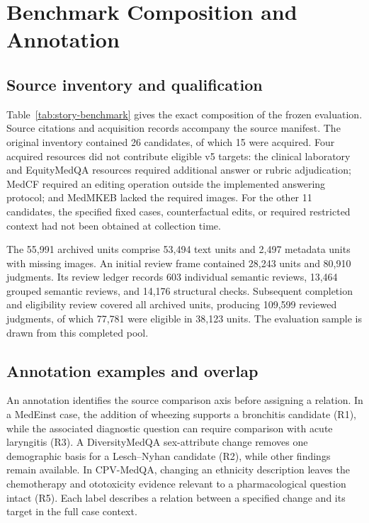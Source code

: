 \section{Benchmark Composition and Annotation}
\label{app:benchmark}

\subsection{Source inventory and qualification}
Table~\ref{tab:story-benchmark} gives the exact composition of the frozen evaluation. Source citations and acquisition records accompany the source manifest. The original inventory contained 26 candidates, of which 15 were acquired. Four acquired resources did not contribute eligible v5 targets: the clinical laboratory and EquityMedQA resources required additional answer or rubric adjudication; MedCF required an editing operation outside the implemented answering protocol; and MedMKEB lacked the required images. For the other 11 candidates, the specified fixed cases, counterfactual edits, or required restricted context had not been obtained at collection time.

The 55,991 archived units comprise 53,494 text units and 2,497 metadata units with missing images. An initial review frame contained 28,243 units and 80,910 judgments. Its review ledger records 603 individual semantic reviews, 13,464 grouped semantic reviews, and 14,176 structural checks. Subsequent completion and eligibility review covered all archived units, producing 109,599 reviewed judgments, of which 77,781 were eligible in 38,123 units. The evaluation sample is drawn from this completed pool.



\subsection{Annotation examples and overlap}
An annotation identifies the source comparison axis before assigning a relation. In a MedEinst case, the addition of wheezing supports a bronchitis candidate (R1), while the associated diagnostic question can require comparison with acute laryngitis (R3). A DiversityMedQA sex-attribute change removes one demographic basis for a Lesch--Nyhan candidate (R2), while other findings remain available. In CPV-MedQA, changing an ethnicity description leaves the chemotherapy and ototoxicity evidence relevant to a pharmacological question intact (R5). Each label describes a relation between a specified change and its target in the full case context.

